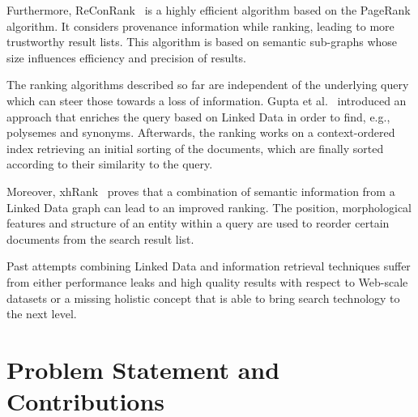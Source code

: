 \begin{itemize}
Furthermore, ReConRank~\cite{reconrank} is a highly efficient algorithm based on the \mbox{PageRank} algorithm. 
It considers provenance information while ranking, leading to more trustworthy result lists. 
This algorithm is based on semantic sub-graphs whose size influences efficiency and precision of results. 

The ranking algorithms described so far are independent of the underlying query which can steer those towards a loss of information.
Gupta et al.~\cite{gupta} introduced an approach that enriches the query based on Linked Data in order to find, e.g., polysemes and synonyms. 
Afterwards, the ranking works on a context-ordered index retrieving an initial sorting of the documents, which are finally sorted according to their similarity to the query.

Moreover, xhRank~\cite{xhRank} proves that a combination of semantic information from a Linked Data graph can lead to an improved ranking. The position, morphological features and structure of an entity within a query are used to reorder certain documents from the search result list.

Past attempts combining Linked Data and information retrieval techniques suffer from either performance leaks and high quality results with respect to Web-scale datasets or a missing holistic concept that is able to bring search technology to the next level.

\end{itemize}
\section{Problem Statement and Contributions}\label{contributions}

